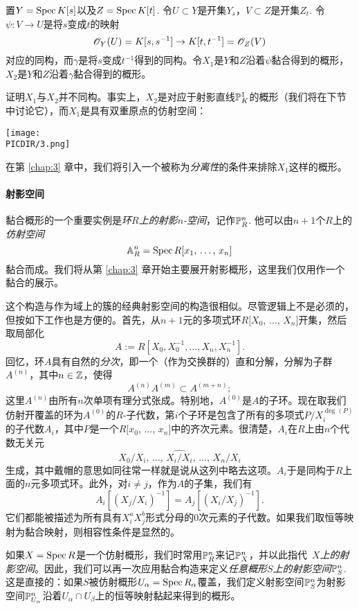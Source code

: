 \begin{exe}\label{exe:1.44}
置$Y=\spec K[s]$以及$Z=\spec K[t]$. 令$U\subset Y$是开集$Y_s$，$V\subset Z$是开集$Z_t$. 令$\psi:V\to U$是将$s$变成$t$的映射
\[
	\oo_Y(U)=K[s,s^{-1}]\to K[t,t^{-1}]=\oo_Z(V)
\]
对应的同构，而$\gamma$是将$s$变成$t^{-1}$得到的同构。令$X_1$是$Y$和$Z$沿着$\psi$黏合得到的概形，$X_2$是$Y$和$Z$沿着$\gamma$黏合得到的概形。

证明$X_1$与$X_2$并不同构。事实上，$X_2$是对应于射影直线$\P_K^1$的概形（我们将在下节中讨论它），而$X_1$是具有双重原点的仿射空间：

\begin{center}\texttt{[image: \\PICDIR/3.png]}\end{center}

在第 \ref{chap:3} 章中，我们将引入一个被称为\textit{分离性}的条件来排除$X_1$这样的概形。
\end{exe}

\paragraph*{射影空间}
黏合概形的一个重要实例是\textit{环$R$上的射影$n$-空间}，记作$\P^n_R$. 他可以由$n+1$个$R$上的\textit{仿射空间}
\[
	\A_R^n=\spec R[\text{$x_1$, $\dots$, $x_n$}]
\]
黏合而成。我们将从第 \ref{chap:3} 章开始主要展开射影概形，这里我们仅用作一个黏合的展示。

这个构造与作为域上的簇的经典射影空间的构造很相似。尽管逻辑上不是必须的，但按如下工作也是方便的。首先，从$n+1$元的多项式环$R[X_0$, $\dots$, $X_n]$开集，然后取局部化
\[
	A:=R[X_0,X_0^{-1},\dots,X_n,X_n^{-1}].
\]
回忆，环$A$具有自然的\textit{分次}，即一个（作为交换群的）直和分解，分解为子群$A^{(n)}$，其中$n\in \zz$，使得
\[
	A^{(n)}A^{(m)}\subset A^{(m+n)};
\]
这里$A^{(n)}$由所有$n$次单项有理分式张成。特别地，$A^{(0)}$是$A$的子环。现在取我们仿射开覆盖的环为$A^{(0)}$的$R$-子代数，第$i$个子环是包含了所有的多项式$P/X_i^{\deg(P)}$的子代数$A_i$，其中$P$是一个$R[x_0$, $\dots$, $x_n]$中的齐次元素。很清楚，$A_i$在$R$上由$n$个代数无关元
\[
	X_0/X_i,\,\dots,\,\widehat{X_i/X_i},\,\dots,\,X_n/X_i
\]
生成，其中戴帽的意思如同往常一样就是说从这列中略去这项。$A_i$于是同构于$R$上面的$n$元多项式环。此外，对$i\neq j$，作为$A$的子集，我们有
\[
	A_i[(X_j/X_i)^{-1}]=A_j[(X_i/X_j)^{-1}].
\]
它们都能被描述为所有具有$X_i^aX_j^b$形式分母的$0$次元素的子代数。如果我们取恒等映射为黏合映射，则相容性条件是显然的。

如果$X=\spec R$是一个仿射概形，我们时常用$\P^n_R$来记$\P^n_X$，并以此指代~\textit{$X$上的射影空间}。因此，我们可以再一次应用黏合构造来定义\textit{任意概形$S$上的射影空间$\P_S^n$}. 这是直接的：如果$S$被仿射概形$U_\alpha=\spec R_\alpha$覆盖，我们定义射影空间$\P_S^n$为射影空间$\P_{U_\alpha}^n$沿着$U_\alpha\cap U_\beta$上的恒等映射黏起来得到的概形。
